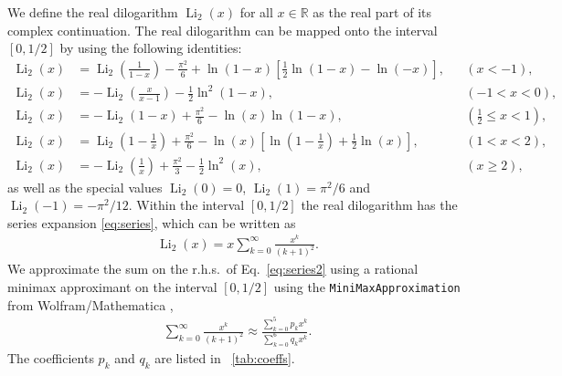 \documentclass[10pt,DIV16,twocolumn,numbers=noenddot]{scrartcl}
\newcommand{\Li}{\operatorname{Li}_2}
\newcommand{\tabref}[1]{\tablename~\ref{#1}}
\begin{document}
We define the real dilogarithm $\Li(x)$ for all $x\in\mathbb{R}$ as
the real part of its complex continuation.  The real dilogarithm can
be mapped onto the interval $[0,1/2]$ by using the following
identities:
%
\begin{align}%
  \Li(x) &= \Li\left(\frac{1}{1-x}\right) - \frac{\pi^2}{6} + \ln(1-x)\left[\frac{1}{2}\ln(1-x) - \ln(-x)\right], && (x<-1), \\
  \Li(x) &= -\Li\left(\frac{x}{x-1}\right) - \frac{1}{2}\ln^2(1-x), && (-1<x<0), \\
  \Li(x) &= -\Li(1-x) + \frac{\pi^2}{6} - \ln(x) \ln(1-x), && (\frac{1}{2}\leq x<1), \\
  \Li(x) &= \Li\left(1-\frac{1}{x}\right) + \frac{\pi^2}{6} - \ln(x)\left[\ln\left(1-\frac{1}{x}\right) + \frac{1}{2}\ln(x)\right], && (1<x<2), \\
  \Li(x) &= -\Li\left(\frac{1}{x}\right) + \frac{\pi^2}{3} - \frac{1}{2} \ln^2(x), && (x\geq 2),%
\end{align}%
%
as well as the special values $\Li(0)=0$, $\Li(1)=\pi^2/6$ and
$\Li(-1)=-\pi^2/12$.  Within the interval $[0,1/2]$ the real
dilogarithm has the series expansion \eqref{eq:series}, which can be
written as
%
\begin{align}
  \Li(x) = x \sum_{k=0}^\infty \frac{x^{k}}{(k+1)^2}.
  \label{eq:series2}
\end{align}
%
We approximate the sum on the r.h.s.\ of Eq.~\eqref{eq:series2} using
a rational minimax approximant on the interval $[0,1/2]$ using the
\texttt{MiniMaxApproximation} from Wolfram/Mathematica
\cite{mathematica},
%
\begin{align}
  \sum_{k=0}^\infty \frac{x^{k}}{(k+1)^2} \approx
  \frac{\sum_{k=0}^5 p_kx^k}{\sum_{k=0}^6 q_kx^k}.
  \label{eq:minimax}
\end{align}
%
The coefficients $p_k$ and $q_k$ are listed in \tabref{tab:coeffs}.
%
\end{document}
